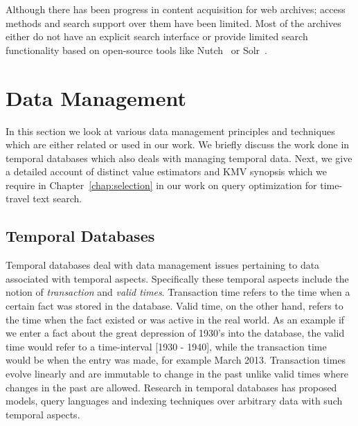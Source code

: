 Although there has been progress in content acquisition for web archives; access methods and search support over them have been limited. Most of the archives either do not have an explicit search interface or provide limited search functionality based on open-source tools like Nutch~\cite{nutchwax} or Solr~\cite{solr}. 


\section{Data Management}
In this section we look at various data management principles and techniques which are either related or used in our work. We briefly discuss the work done in temporal databases which also deals with managing temporal data. Next, we give a detailed account of distinct value estimators and KMV synopsis which we require in Chapter~\ref{chap:selection} in our work on query optimization for time-travel text search.

\subsection{Temporal Databases}

Temporal databases deal with data management issues pertaining to data associated with temporal aspects. Specifically these temporal aspects include the notion of \emph{transaction} and \emph{valid times}. Transaction time refers to the time when a certain fact was stored in the database. Valid time, on the other hand, refers to the time when the fact existed or was active in the real world. As an example if we enter a fact about the great depression of 1930's into the database, the valid time would refer to a time-interval [1930 - 1940], while the transaction time would be when the entry was made, for example March 2013. Transaction times evolve linearly and are immutable to change in the past unlike valid times where changes in the past are allowed. Research in temporal databases has proposed models, query languages and indexing techniques over arbitrary data with such temporal aspects. 


